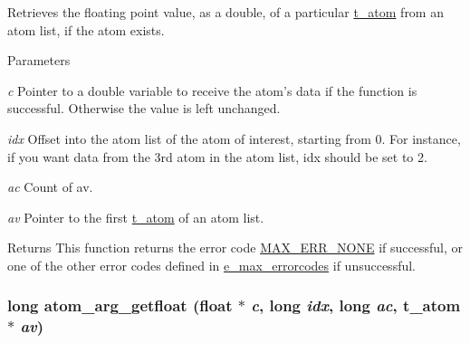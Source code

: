Retrieves the floating point value, as a double, of a particular \hyperlink{structt__atom}{t\_\-atom} from an atom list, if the atom exists. 
\begin{DoxyParams}{Parameters}
\item[{\em c}]Pointer to a double variable to receive the atom's data if the function is successful. Otherwise the value is left unchanged. \item[{\em idx}]Offset into the atom list of the atom of interest, starting from 0. For instance, if you want data from the 3rd atom in the atom list, {\ttfamily idx} should be set to 2. \item[{\em ac}]Count of av. \item[{\em av}]Pointer to the first \hyperlink{structt__atom}{t\_\-atom} of an atom list.\end{DoxyParams}
\begin{DoxyReturn}{Returns}
This function returns the error code \hyperlink{group__misc_gga0764dd6c02b76cca7d053ae50555d69da6d22f77fef8b1e1b074cef5d29d935fd}{MAX\_\-ERR\_\-NONE} if successful, or one of the other error codes defined in \hyperlink{group__misc_ga0764dd6c02b76cca7d053ae50555d69d}{e\_\-max\_\-errorcodes} if unsuccessful. 
\end{DoxyReturn}
\hypertarget{group__atom_ga06e305ddb4fde46ef2e8b66a7e578d61}{
\subsubsection[{atom\_\-arg\_\-getfloat}]{\setlength{\rightskip}{0pt plus 5cm}long atom\_\-arg\_\-getfloat (float $\ast$ {\em c}, \/  long {\em idx}, \/  long {\em ac}, \/  {\bf t\_\-atom} $\ast$ {\em av})}}
\label{group__atom_ga06e305ddb4fde46ef2e8b66a7e578d61}


